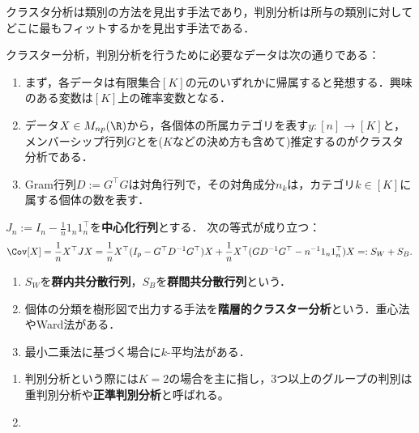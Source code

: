 \documentclass[uplatex,dvipdfmx]{jsreport}
\begin{document}
\begin{tcolorbox}[colframe=ForestGreen, colback=ForestGreen!10!white,breakable,colbacktitle=ForestGreen!40!white,coltitle=black,fonttitle=\bfseries\sffamily,
title=]
    クラスタ分析は類別の方法を見出す手法であり，判別分析は所与の類別に対してどこに最もフィットするかを見出す手法である．
\end{tcolorbox}

\begin{problem}[類別の問題]
    クラスター分析，判別分析を行うために必要なデータは次の通りである：
    \begin{enumerate}
        \item まず，各データは有限集合$[K]$の元のいずれかに帰属すると発想する．興味のある変数は$[K]$上の確率変数となる．
        \item データ$X\in M_{np}(\R)$から，各個体の所属カテゴリを表す$y:[n]\to[K]$と，メンバーシップ行列$G$とを($K$などの決め方も含めて)推定するのがクラスタ分析である．
        \item Gram行列$D:=G^\top G$は対角行列で，その対角成分$n_k$は，カテゴリ$k\in[K]$に属する個体の数を表す．
    \end{enumerate}
\end{problem}

\begin{proposition}
    $J_n:=I_n-\frac{1}{n}1_n1_n^\top$を\textbf{中心化行列}とする．
    次の等式が成り立つ：
    \[\Cov[X]=\frac{1}{n}X^\top JX=\frac{1}{n}X^\top(I_p-G^\top D^{-1}G^\top)X+\frac{1}{n}X^\top(GD^{-1}G^\top -n^{-1}1_n1_n^\top)X=:S_W+S_B.\]
\end{proposition}

\begin{definition}\mbox{}
    \begin{enumerate}
        \item $S_W$を\textbf{群内共分散行列}，$S_B$を\textbf{群間共分散行列}という．
        \item 個体の分類を樹形図で出力する手法を\textbf{階層的クラスター分析}という．重心法やWard法がある．
        \item 最小二乗法に基づく場合に$k$-平均法がある．
    \end{enumerate}
\end{definition}

\begin{definition}\mbox{}
    \begin{enumerate}
        \item 判別分析という際には$K=2$の場合を主に指し，3つ以上のグループの判別は重判別分析や\textbf{正準判別分析}と呼ばれる。
        \item 
    \end{enumerate}
\end{definition}
\end{document}
